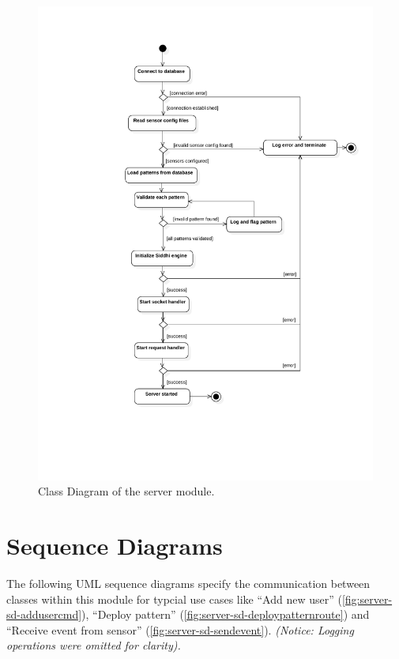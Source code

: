 \FloatBarrier
\begin{figure}[h]
    \centering
    \includegraphics[width=\textwidth]{../module_res/server-act-start.pdf}
    \caption{Class Diagram of the server module.
    \label{fig:server-class}}
\end{figure}
\FloatBarrier


\section{Sequence Diagrams}
The following UML sequence diagrams specify the communication between classes
within this module for typcial use cases like
\enquote{Add new user} (\autoref{fig:server-sd-addusercmd}),
\enquote{Deploy pattern} (\autoref{fig:server-sd-deploypatternroute}) and
\enquote{Receive event from sensor} (\autoref{fig:server-sd-sendevent}).
\emph{(Notice: Logging operations were omitted for clarity).}

